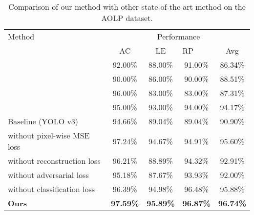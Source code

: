 \documentclass[a4paper,twoside]{article}
\begin{document}
\setlength{\tabcolsep}{10pt}
    \begin{table*}
    \begin{center}
    \caption{Comparison of our method with other state-of-the-art method on the AOLP dataset. 
    }
    \label{table:headings}
    \begin{tabular}{l|ccc | c}
    \hline\hline
    {Method}       & \multicolumn{4}{c}{Performance}                          \\ \cline{2-5} 
                                  & AC         & LE         & \multicolumn{1}{l|}{RP}         & Avg     \\ \hline\hline
    \cite{anagnostopoulos2006license}          & 92.00\%          & 88.00\%          & \multicolumn{1}{c|}{91.00\%}          & 86.34\%          \\
    
    \cite{jiao2009configurable} & 90.00\%          & 86.00\%          & \multicolumn{1}{c|}{90.00\%}          & 88.51\%           \\
    
    \cite{smith2007overview}             & 96.00\%          & 83.00\%          & \multicolumn{1}{c|}{83.00\%}          & 87.31\%           \\
    
    \cite{hsu2013application}        & 95.00\%          & 93.00\%        & \multicolumn{1}{c|}{94.00\%}          & 94.17\%          \\\hline\hline
    Baseline (YOLO v3) \cite{redmon2018yolov3}                     & 94.66\%          & 89.04\%          & \multicolumn{1}{c|}{89.04\%}          & 90.90\%         \\ 
    without pixel-wise MSE loss                     &97.24\%          & 94.67\%          & \multicolumn{1}{c|}{94.91\%}          & 95.60\%         \\ 
    without reconstruction loss                     & 96.21\%          & 88.89\%          & \multicolumn{1}{c|}{94.32\%}          & 92.91\%         \\ 
    without adversarial loss                     & 95.18\%          & 87.67\%          & \multicolumn{1}{c|}{93.93\%}          & 92.00\%         \\ 
    without classification loss                     & 96.39\%          & 94.98\%          & \multicolumn{1}{c|}{96.48\%}          & 95.88\%         \\ 
    \textbf{Ours}                          & \textbf{97.59\%} & \textbf{95.89\%} & \multicolumn{1}{c|}{\textbf{96.87\%}} & \textbf{96.74\%} \\ \hline\hline
    \end{tabular}
    \end{center}
    \end{table*}
    \setlength{\tabcolsep}{1.4pt}
    
\end{document}
